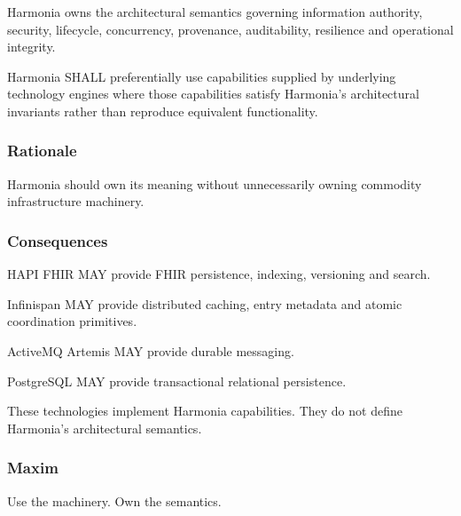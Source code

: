 Harmonia owns the architectural semantics governing information authority, security, lifecycle, concurrency, provenance, auditability, resilience and operational integrity.

\label{rad:axioms:212}

Harmonia SHALL preferentially use capabilities supplied by underlying technology engines where those capabilities satisfy Harmonia's architectural invariants rather than reproduce equivalent functionality.

\label{rad:axioms:216}
\subsubsection*{Rationale}
\label{rad:axioms:218}

Harmonia should own its meaning without unnecessarily owning commodity infrastructure machinery.

\label{rad:axioms:221}
\subsubsection*{Consequences}
\label{rad:axioms:223}

HAPI FHIR MAY provide FHIR persistence, indexing, versioning and search.

\label{rad:axioms:225}

Infinispan MAY provide distributed caching, entry metadata and atomic coordination primitives.

\label{rad:axioms:228}

ActiveMQ Artemis MAY provide durable messaging.

\label{rad:axioms:230}

PostgreSQL MAY provide transactional relational persistence.

\label{rad:axioms:232}

These technologies implement Harmonia capabilities. They do not define Harmonia's architectural semantics.

\label{rad:axioms:235}
\subsubsection*{Maxim}
\label{rad:axioms:237}

Use the machinery. Own the semantics.

\label{rad:axioms:239}

